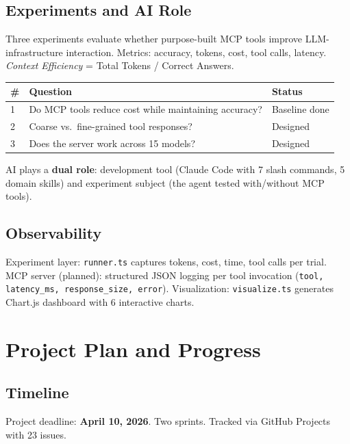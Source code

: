 \documentclass[10pt,twocolumn]{article}
\begin{document}
\subsection{Experiments and AI Role}

Three experiments evaluate whether purpose-built MCP tools improve LLM-infrastructure interaction. Metrics: accuracy, tokens, cost, tool calls, latency. \textit{Context Efficiency} = Total Tokens / Correct Answers.

\begin{table}[h]
\centering\small
\begin{tabularx}{\columnwidth}{lXl}
\toprule
\textbf{\#} & \textbf{Question} & \textbf{Status} \\
\midrule
1 & Do MCP tools reduce cost while maintaining accuracy? & Baseline done \\
2 & Coarse vs.\ fine-grained tool responses? & Designed \\
3 & Does the server work across 15 models? & Designed \\
\bottomrule
\end{tabularx}
\end{table}

AI plays a \textbf{dual role}: development tool (Claude Code with 7 slash commands, 5 domain skills) and experiment subject (the agent tested with/without MCP tools).

\subsection{Observability}

Experiment layer: \texttt{runner.ts} captures tokens, cost, time, tool calls per trial. MCP server (planned): structured JSON logging per tool invocation (\texttt{tool, latency\_ms, response\_size, error}). Visualization: \texttt{visualize.ts} generates Chart.js dashboard with 6 interactive charts.

\section{Project Plan and Progress}

\subsection{Timeline}

Project deadline: \textbf{April 10, 2026}. Two sprints. Tracked via GitHub Projects with 23 issues.
\end{document}
